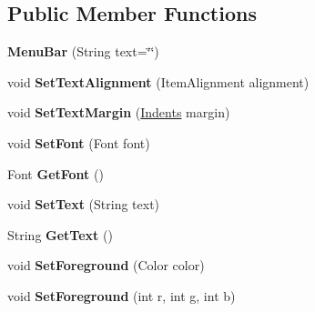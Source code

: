\subsection*{Public Member Functions}
\begin{DoxyCompactItemize}
\item 
\mbox{\label{class_space_v_i_l_1_1_menu_bar_a77b62ef759f950393eaf0ea32c89560d}} 
{\bfseries Menu\+Bar} (String text=\char`\"{}\char`\"{})
\item 
\mbox{\label{class_space_v_i_l_1_1_menu_bar_a791da28290ce875327056617f42809e2}} 
void {\bfseries Set\+Text\+Alignment} (Item\+Alignment alignment)
\item 
\mbox{\label{class_space_v_i_l_1_1_menu_bar_ad9796582c454877458271fa8fcfd7749}} 
void {\bfseries Set\+Text\+Margin} (\mbox{\hyperlink{struct_space_v_i_l_1_1_decorations_1_1_indents}{Indents}} margin)
\item 
\mbox{\label{class_space_v_i_l_1_1_menu_bar_a24c4a1d6da17cf4f95ddef8bbbf23ea9}} 
void {\bfseries Set\+Font} (Font font)
\item 
\mbox{\label{class_space_v_i_l_1_1_menu_bar_adf1a93d0be57a1f3f2d3a35d8af0d7fc}} 
Font {\bfseries Get\+Font} ()
\item 
\mbox{\label{class_space_v_i_l_1_1_menu_bar_a7f93d9c7da5319a04052938e66090ee5}} 
void {\bfseries Set\+Text} (String text)
\item 
\mbox{\label{class_space_v_i_l_1_1_menu_bar_a8907f7d555de9a5cef78da6be2475238}} 
String {\bfseries Get\+Text} ()
\item 
\mbox{\label{class_space_v_i_l_1_1_menu_bar_aa0c13847c64b4ba1e843a3302a14fe89}} 
void {\bfseries Set\+Foreground} (Color color)
\item 
\mbox{\label{class_space_v_i_l_1_1_menu_bar_a51d3435a7f9dc7b9e4424f1f6abe8356}} 
void {\bfseries Set\+Foreground} (int r, int g, int b)

\end{DoxyCompactItemize}

